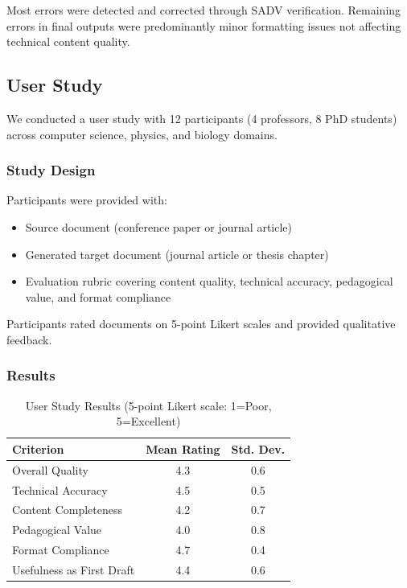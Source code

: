 \documentclass{ieeeaccess}
\begin{document}
Most errors were detected and corrected through SADV verification. Remaining errors in final outputs were predominantly minor formatting issues not affecting technical content quality.

\subsection{User Study}

We conducted a user study with 12 participants (4 professors, 8 PhD students) across computer science, physics, and biology domains.

\subsubsection{Study Design}

Participants were provided with:
\begin{itemize}
\item Source document (conference paper or journal article)
\item Generated target document (journal article or thesis chapter)
\item Evaluation rubric covering content quality, technical accuracy, pedagogical value, and format compliance
\end{itemize}

Participants rated documents on 5-point Likert scales and provided qualitative feedback.

\subsubsection{Results}

\begin{table}[!t]
\caption{User Study Results (5-point Likert scale: 1=Poor, 5=Excellent)}
\label{tab:user-study}
\centering
\renewcommand{\arraystretch}{1.3}
\small
\begin{tabular}{lcc}
\toprule
\textbf{Criterion} & \textbf{Mean Rating} & \textbf{Std. Dev.} \\
\midrule
Overall Quality & 4.3 & 0.6 \\
Technical Accuracy & 4.5 & 0.5 \\
Content Completeness & 4.2 & 0.7 \\
Pedagogical Value & 4.0 & 0.8 \\
Format Compliance & 4.7 & 0.4 \\
Usefulness as First Draft & 4.4 & 0.6 \\
\bottomrule
\end{tabular}
\normalsize
\end{table}
\end{document}
